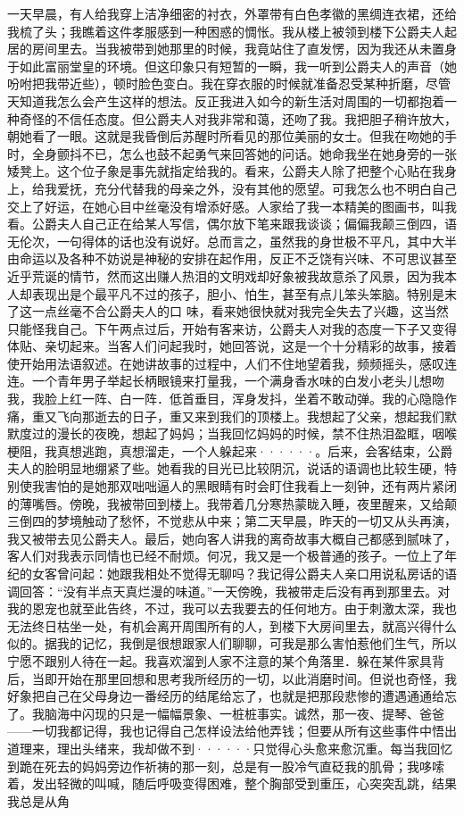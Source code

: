 \documentclass[12pt, UTF8]{ctexbook}
\begin{document}
\par 一天早晨，有人给我穿上洁净细密的衬衣，外罩带有白色孝徽的黑绸连衣裙，还给我梳了头；我瞧着这件孝服感到一种困惑的惆怅。我从楼上被领到楼下公爵夫人起居的房间里去。当我被带到她那里的时候，我竟站住了直发愣，因为我还从未置身于如此富丽堂皇的环境。但这印象只有短暂的一瞬，我一听到公爵夫人的声音（她吩咐把我带近些），顿时脸色变白。我在穿衣服的时候就准备忍受某种折磨，尽管天知道我怎么会产生这样的想法。反正我进入如今的新生活对周围的一切都抱着一种奇怪的不信任态度。但公爵夫人对我非常和蔼，还吻了我。我把胆子稍许放大，朝她看了一眼。这就是我昏倒后苏醒时所看见的那位美丽的女士。但我在吻她的手时，全身颤抖不已，怎么也鼓不起勇气来回答她的问话。她命我坐在她身旁的一张矮凳上。这个位子象是事先就指定给我的。看来，公爵夫人除了把整个心贴在我身上，给我爱抚，充分代替我的母亲之外，没有其他的愿望。可我怎么也不明白自己交上了好运，在她心目中丝毫没有增添好感。人家给了我一本精美的图画书，叫我看。公爵夫人自己正在给某人写信，偶尔放下笔来跟我谈谈；偏偏我颠三倒四，语无伦次，一句得体的话也没有说好。总而言之，虽然我的身世极不平凡，其中大半由命运以及各种不妨说是神秘的安排在起作用，反正不乏饶有兴味、不可思议甚至近乎荒诞的情节，然而这出赚人热泪的文明戏却好象被我故意杀了风景，因为我本人却表现出是个最平凡不过的孩子，胆小、怕生，甚至有点儿笨头笨脑。特别是末了这一点丝毫不合公爵夫人的口 味，看来她很快就对我完全失去了兴趣，这当然只能怪我自己。下午两点过后，开始有客来访，公爵夫人对我的态度一下子又变得体贴、亲切起来。当客人们问起我时，她回答说，这是一个十分精彩的故事，接着使开始用法语叙述。在她讲故事的过程中，人们不住地望着我，频频摇头，感叹连连。一个青年男子举起长柄眼镜来打量我，一个满身香水味的白发小老头儿想吻我，我脸上红一阵、白一阵．低首垂目，浑身发抖，坐着不敢动弹。我的心隐隐作痛，重又飞向那逝去的日子，重又来到我们的顶楼上。我想起了父亲，想起我们默默度过的漫长的夜晚，想起了妈妈；当我回忆妈妈的时候，禁不住热泪盈眶，咽喉梗阻，我真想逃跑，真想溜走，一个人躲起来······。后来，会客结束，公爵夫人的脸明显地绷紧了些。她看我的目光已比较阴沉，说话的语调也比较生硬，特别使我害怕的是她那双咄咄逼人的黑眼睛有时会盯住我看上一刻钟，还有两片紧闭的薄嘴唇。傍晚，我被带回到楼上。我带着几分寒热蒙眬入睡，夜里醒来，又给颠三倒四的梦境触动了愁怀，不觉悲从中来；第二天早晨，昨天的一切又从头再演，我又被带去见公爵夫人。最后，她向客人讲我的离奇故事大概自己都感到腻味了，客人们对我表示同情也已经不耐烦。何况，我又是一个极普通的孩子。一位上了年纪的女客曾问起：她跟我相处不觉得无聊吗？我记得公爵夫人亲口用说私房话的语调回答：“没有半点天真烂漫的味道。”一天傍晚，我被带走后没有再到那里去。对我的恩宠也就至此告终，不过，我可以去我要去的任何地方。由于刺激太深，我也无法终日枯坐一处，有机会离开周围所有的人，到楼下大房间里去，就高兴得什么似的。据我的记忆，我倒是很想跟家人们聊聊，可我是那么害怕惹他们生气，所以宁愿不跟别人待在一起。我喜欢溜到人家不注意的某个角落里．躲在某件家具背后，当即开始在那里回想和思考我所经历的一切，以此消磨时间。但说也奇怪，我好象把自己在父母身边一番经历的结尾给忘了，也就是把那段悲惨的遭遇通通给忘了。我脑海中闪现的只是一幅幅景象、一桩桩事实。诚然，那一夜、提琴、爸爸——一切我都记得，我也记得自己怎样设法给他弄钱；但要从所有这些事件中悟出道理来，理出头绪来，我却做不到······只觉得心头愈来愈沉重。每当我回忆到跪在死去的妈妈旁边作祈祷的那一刻，总是有一股冷气直砭我的肌骨；我哆嗦着，发出轻微的叫喊，随后呼吸变得困难，整个胸部受到重压，心突突乱跳，结果我总是从角
\end{document}

